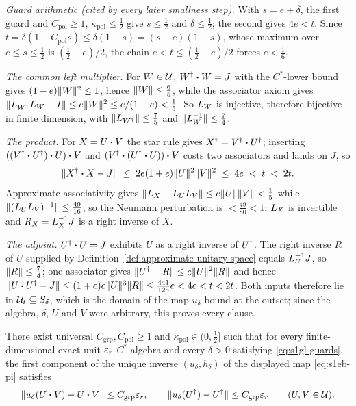\emph{Guard arithmetic (cited by every later smallness step).} With $s=e+\delta$, the first
guard and $C_{\mathrm{pol}}\ge1$, $\kappa_{\mathrm{pol}}\le\tfrac12$ give $s\le\tfrac12$ and
$\delta\le\tfrac12$; the second gives $4e<t$. Since
$t=\delta(1-C_{\mathrm{pol}}s)\le\delta(1-s)=(s-e)(1-s)$, whose maximum over
$e\le s\le\tfrac12$ is $(\tfrac12-e)/2$, the chain $e<t\le(\tfrac12-e)/2$ forces
$e<\tfrac16$.

\emph{The common left multiplier.} For $W\in\mathcal U$, $W^{\dagger}\mathbin{\bm{\cdot}} W=J$ with the $C^*$-lower
bound gives $(1-e)\lVert W\rVert^{2}\le1$, hence $\lVert W\rVert\le\tfrac65$, while the associator axiom
gives $\lVert L_{W^{\dagger}}L_{W}-I\rVert\le e\lVert W\rVert^{2}\le e/(1-e)<\tfrac15$. So $L_{W}$ is
injective, therefore bijective in finite dimension, with $\lVert L_{W^{\dagger}}\rVert\le\tfrac75$ and
$\lVert L_{W}^{-1}\rVert\le\tfrac74$.

\emph{The product.} For $X=U\mathbin{\bm{\cdot}} V$ the star rule gives $X^{\dagger}=V^{\dagger}\mathbin{\bm{\cdot}} U^{\dagger}$; inserting
$((V^{\dagger}\mathbin{\bm{\cdot}} U^{\dagger})\mathbin{\bm{\cdot}} U)\mathbin{\bm{\cdot}} V$ and $(V^{\dagger}\mathbin{\bm{\cdot}}(U^{\dagger}\mathbin{\bm{\cdot}} U))\mathbin{\bm{\cdot}} V$ costs two
associators and lands on $J$, so
\begin{equation}\label{eq:s1eb-proddefect}
  \lVert X^{\dagger}\mathbin{\bm{\cdot}} X-J\rVert\;\le\;2e(1+e)\lVert U\rVert^{2}\lVert V\rVert^{2}\;\le\;4e\;<\;t\;<\;2t .
\end{equation}
Approximate associativity gives $\lVert L_{X}-L_{U}L_{V}\rVert\le e\lVert U\rVert\lVert V\rVert<\tfrac15$
while $\lVert (L_{U}L_{V})^{-1}\rVert\le\tfrac{49}{16}$, so the Neumann perturbation is
$<\tfrac{49}{80}<1$: $L_{X}$ is invertible and $R_X=L_{X}^{-1}J$ is a right inverse
of $X$.

\emph{The adjoint.} $U^{\dagger}\mathbin{\bm{\cdot}} U=J$ exhibits $U$ as a right inverse of $U^{\dagger}$. The right
inverse $R$ of $U$ supplied by Definition~\ref{def:approximate-unitary-space} equals
$L_{U}^{-1}J$, so $\lVert R\rVert\le\tfrac74$; one associator gives
$\lVert U^{\dagger}-R\rVert\le e\lVert U\rVert^{2}\lVert R\rVert$ and hence
$\lVert U\mathbin{\bm{\cdot}} U^{\dagger}-J\rVert\le(1+e)e\lVert U\rVert^{3}\lVert R\rVert\le\tfrac{441}{125}e<4e<t<2t$. Both inputs
therefore lie in $\mathcal U_{t}\subseteq S_\delta$, which is the domain of the map $u_\delta$
bound at the outset; since the algebra, $\delta$, $U$ and $V$ were arbitrary, this proves
every clause.

\begin{lemma}\label{lem:stage1-explicit-group-closeness}
There exist universal $C_{\mathrm{grp}},C_{\mathrm{pol}}\ge1$ and
$\kappa_{\mathrm{pol}}\in(0,\tfrac12]$ such that for every finite-dimensional exact-unit
$\varepsilon_r$-$C^*$-algebra and every $\delta>0$ satisfying \eqref{eq:s1gl-guards}, the first
component of the unique inverse $(u_\delta,h_\delta)$ of the displayed map
\eqref{eq:s1eb-pi} satisfies
\begin{equation}\label{eq:s1eb-close}
  \lVert u_\delta(U\mathbin{\bm{\cdot}} V)-U\mathbin{\bm{\cdot}} V\rVert\le C_{\mathrm{grp}}\varepsilon_r,
  \qquad
  \lVert u_\delta(U^{\dagger})-U^{\dagger}\rVert\le C_{\mathrm{grp}}\varepsilon_r
  \qquad(U,V\in\mathcal U).
\end{equation}
\end{lemma}

